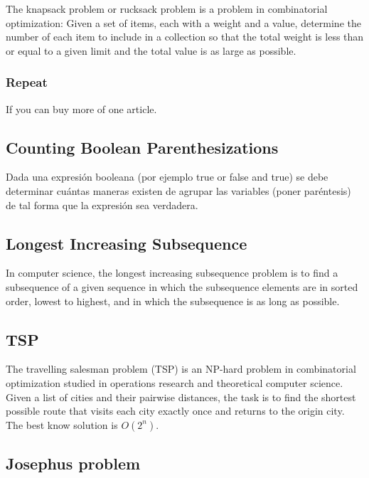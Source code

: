 \documentclass[10pt,letterpaper,twocolumn,twosided]{article}
\newcommand{\codigofuente}[1]{

\dotfill
}
\begin{document}
The knapsack problem or rucksack problem is a problem in combinatorial optimization: Given a set of items, each with a weight and a value, determine the number of each item to include in a collection so that the total weight is less than or equal to a given limit and the total value is as large as possible.

\codigofuente{src/dp/knapsack.cpp}

\subsubsection{Repeat}
If you can buy more of one article.

\codigofuente{src/dp/knapsackrepeat.cpp}

\subsection{Counting Boolean Parenthesizations}

Dada una expresión booleana (por ejemplo true or false and true) se debe determinar cuántas maneras existen de agrupar las variables (poner paréntesis) de tal forma que la expresión sea verdadera.

\subsection{Longest Increasing Subsequence}

In computer science, the longest increasing subsequence problem is to find a subsequence of a given sequence in which the subsequence elements are in sorted order, lowest to highest, and in which the subsequence is as long as possible.

\codigofuente{src/dp/lis.cpp}

\subsection{TSP}

The travelling salesman problem (TSP) is an NP-hard problem in combinatorial optimization studied in operations research and theoretical computer science. Given a list of cities and their pairwise distances, the task is to find the shortest possible route that visits each city exactly once and returns to the origin city. The best know solution is $O(2^n)$.

\codigofuente{src/dp/tsp.cpp}

\subsection{Josephus problem}
\end{document}
